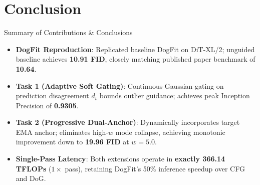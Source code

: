 \documentclass[aspectratio=169]{beamer}
\begin{document}
\section{Conclusion}

\begin{frame}{Summary of Contributions \& Conclusions}
    \begin{itemize}
        \setlength{\itemsep}{0.4em}
        \item \textbf{DogFit Reproduction}: Replicated baseline DogFit on DiT-XL/2; unguided baseline achieves \textbf{10.91 FID}, closely matching published paper benchmark of \textbf{10.64}.
        \item \textbf{Task 1 (Adaptive Soft Gating)}: Continuous Gaussian gating on prediction disagreement $d_t$ bounds outlier guidance; achieves peak Inception Precision of \textbf{0.9305}.
        \item \textbf{Task 2 (Progressive Dual-Anchor)}: Dynamically incorporates target EMA anchor; eliminates high-$w$ mode collapse, achieving monotonic improvement down to \textbf{19.96 FID} at $w = 5.0$.
        \item \textbf{Single-Pass Latency}: Both extensions operate in \textbf{exactly 366.14 TFLOPs} ($1\times$ pass), retaining DogFit's 50\% inference speedup over CFG and DoG.
    \end{itemize}
\end{frame}
\end{document}

